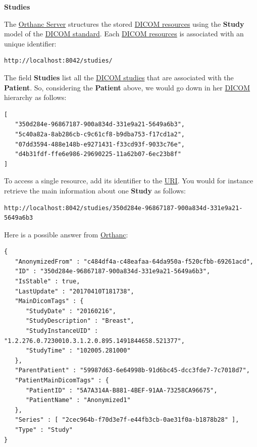 \documentclass{tufte-book} %
\begin{document}

\clearpage


\textbf{Studies}

\hfill

The \href{https://www.orthanc-server.com/}{Orthanc Server} structures the stored \href{http://book.orthanc-server.com/users/rest.html#sending-dicom-images}{DICOM resources} using the \textbf{Study} model of the \href{https://www.dicomstandard.org/current/}{DICOM standard}. Each \href{http://book.orthanc-server.com/users/rest.html#sending-dicom-images}{DICOM resources} is associated with an unique identifier:

\begin{lstlisting}
http://localhost:8042/studies/
\end{lstlisting}

\hfill

The field \textbf{Studies} list all the \href{http://book.orthanc-server.com/users/rest.html#sending-dicom-images}{DICOM studies} that are associated with the \textbf{Patient}. So, considering the \textbf{Patient} above, we would go down in her \href{http://book.orthanc-server.com/users/rest.html#sending-dicom-images}{DICOM} hierarchy as follows:

\begin{lstlisting}
[
   "350d284e-96867187-900a834d-331e9a21-5649a6b3",
   "5c40a82a-8ab286cb-c9c61cf8-b9dba753-f17cd1a2",
   "07dd3594-488e148b-e9271431-f33cd93f-9033c76e",
   "d4b31fdf-ffe6e986-29690225-11a62b07-6ec23b8f"
]
\end{lstlisting}

\hfill

To access a single resource, add its identifier to the \href{https://en.wikipedia.org/wiki/Uniform_resource_identifier}{URI}. You would for instance retrieve the main information about one \textbf{Study} as follows:

\begin{lstlisting}
http://localhost:8042/studies/350d284e-96867187-900a834d-331e9a21-5649a6b3
\end{lstlisting}

\hfill

Here is a possible answer from \href{https://www.orthanc-server.com/}{Orthanc}:

\begin{lstlisting}
{
   "AnonymizedFrom" : "c484df4a-c48eafaa-64da950a-f520cfbb-69261acd",
   "ID" : "350d284e-96867187-900a834d-331e9a21-5649a6b3",
   "IsStable" : true,
   "LastUpdate" : "20170410T181738",
   "MainDicomTags" : {
      "StudyDate" : "20160216",
      "StudyDescription" : "Breast",
      "StudyInstanceUID" : "1.2.276.0.7230010.3.1.2.0.895.1491844658.521377",
      "StudyTime" : "102005.281000"
   },
   "ParentPatient" : "59987d63-6e64998b-91d6bc45-dcc3fde7-7c7018d7",
   "PatientMainDicomTags" : {
      "PatientID" : "5A7A314A-B881-4BEF-91AA-73258CA96675",
      "PatientName" : "Anonymized1"
   },
   "Series" : [ "2cec964b-f70d3e7f-e44fb3cb-0ae31f0a-b1878b28" ],
   "Type" : "Study"
}
\end{lstlisting}
\end{document}
